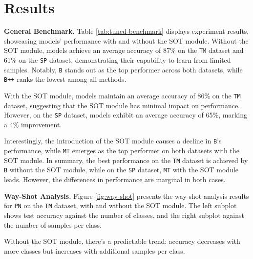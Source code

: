 \section{Results}
\textbf{General Benchmark.} Table \ref{tab:tuned-benchmark} displays experiment results, showcasing models' performance with and without the SOT module. 
Without the SOT module, models achieve an average accuracy of 87\% on the \texttt{TM} dataset and 61\% on the \texttt{SP} dataset, 
demonstrating their capability to learn from limited samples. Notably, \texttt{B} stands out as the top performer across both datasets, 
while \texttt{B++} ranks the lowest among all methods.

With the SOT module, models maintain an average accuracy of 86\% on the \texttt{TM} dataset, 
suggesting that the SOT module has minimal impact on performance. However, on the \texttt{SP} dataset, 
models exhibit an average accuracy of 65\%, marking a 4\% improvement.

Interestingly, the introduction of the SOT module causes a decline in \texttt{B}'s performance, 
while \texttt{MT} emerges as the top performer on both datasets with the SOT module. 
In summary, the best performance on the \texttt{TM} dataset is achieved by \texttt{B} without the SOT module, while on the \texttt{SP} dataset, 
\texttt{MT} with the SOT module leads. However, the differences in performance are marginal in both cases.





\textbf{Way-Shot Analysis.} Figure \ref{fig:way-shot} presents the way-shot analysis results for \texttt{PN} on the \texttt{TM} dataset, with and without the SOT module. 
The left subplot shows test accuracy against the number of classes, and the right subplot against the number of samples per class.

Without the SOT module, there's a predictable trend: accuracy decreases with more classes but increases with additional samples per class. 

